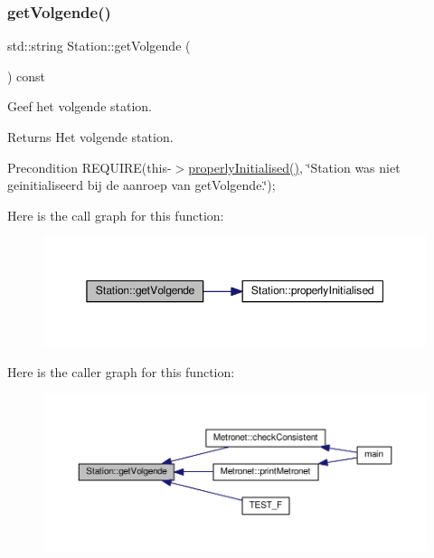 \subsubsection{\texorpdfstring{get\+Volgende()}{getVolgende()}}
{\footnotesize\ttfamily std\+::string Station\+::get\+Volgende (\begin{DoxyParamCaption}{ }\end{DoxyParamCaption}) const}



Geef het volgende station. 

\begin{DoxyReturn}{Returns}
Het volgende station. 
\end{DoxyReturn}
\begin{DoxyPrecond}{Precondition}
R\+E\+Q\+U\+I\+RE(this-\/$>$\hyperlink{class_station_a9ce626dd0599e3ea8107404a59c21e16}{properly\+Initialised()}, \char`\"{}\+Station was niet geinitialiseerd bij de aanroep van get\+Volgende.\char`\"{}); 
\end{DoxyPrecond}
Here is the call graph for this function\+:\nopagebreak
\begin{figure}[H]
\begin{center}
\leavevmode
\includegraphics[width=350pt]{class_station_a1c9f9e7d77d74e7b06bf627bcb2c0067_cgraph}
\end{center}
\end{figure}
Here is the caller graph for this function\+:\nopagebreak
\begin{figure}[H]
\begin{center}
\leavevmode
\includegraphics[width=350pt]{class_station_a1c9f9e7d77d74e7b06bf627bcb2c0067_icgraph}
\end{center}
\end{figure}
\mbox{\label{class_station_a6776dd16c23da9f512d82883ea896fea}} 
